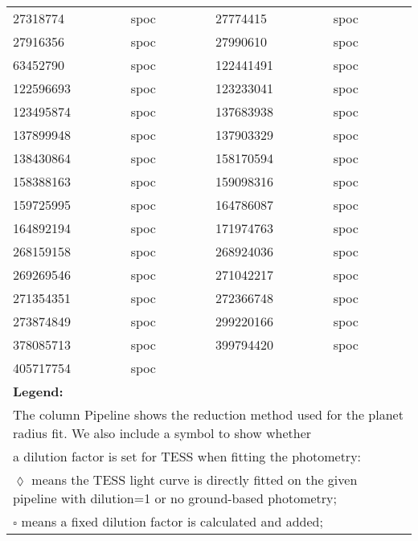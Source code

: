 \begin{longtable}{llrllr}
27318774 & spoc & \cite{TIC_158388163} & 27774415 & spoc & \cite{TIC_27774415} \\
27916356 & spoc & \cite{TIC_27916356} & 27990610 & spoc & \cite{TIC_158388163} \\
63452790 & spoc & \cite{TIC_63452790} & 122441491 & spoc & \cite{TIC_122441491} \\
122596693 & spoc & \cite{TIC_122441491} & 123233041 & spoc & \cite{TIC_27916356} \\
123495874 & spoc & \cite{TIC_123495874} & 137683938 & spoc & \cite{TIC_158388163} \\
137899948 & spoc & \cite{TIC_137899948} & 137903329 & spoc & \cite{TIC_137903329} \\
138430864 & spoc & \cite{TIC_158388163} & 158170594 & spoc & \cite{TIC_27916356} \\
158388163 & spoc & \cite{TIC_158388163} & 159098316 & spoc & \cite{TIC_159098316} \\
159725995 & spoc & \cite{TIC_158388163} & 164786087 & spoc & \cite{TIC_158388163} \\
164892194 & spoc & \cite{TIC_27916356} & 171974763 & spoc & \cite{TIC_158388163} \\
268159158 & spoc & \cite{TIC_158388163} & 268924036 & spoc & \cite{TIC_158388163} \\
269269546 & spoc & \cite{TIC_158388163} & 271042217 & spoc & \cite{TIC_137903329} \\
271354351 & spoc & \cite{TIC_271354351} & 272366748 & spoc & \cite{TIC_158388163} \\
273874849 & spoc & \cite{TIC_273874849} & 299220166 & spoc & \cite{TIC_122441491} \\
378085713 & spoc & \cite{TIC_158388163} & 399794420 & spoc & \cite{TIC_158388163} \\
405717754 & spoc & \cite{TIC_27916356} \\
\hline
\multicolumn{6}{l}{\textbf{Legend:}} \\
\multicolumn{6}{l}{The column Pipeline shows the reduction method used for the planet radius fit. We also include a symbol to show whether } \\
\multicolumn{6}{l}{a dilution factor is set for TESS when fitting the photometry:} \\
\multicolumn{6}{l}{$\lozenge$ means the TESS light curve is directly fitted on the given pipeline with dilution=1 or no ground-based photometry;} \\
\multicolumn{6}{l}{$\square$ means a fixed dilution factor is calculated and added;} \\

\end{longtable}
